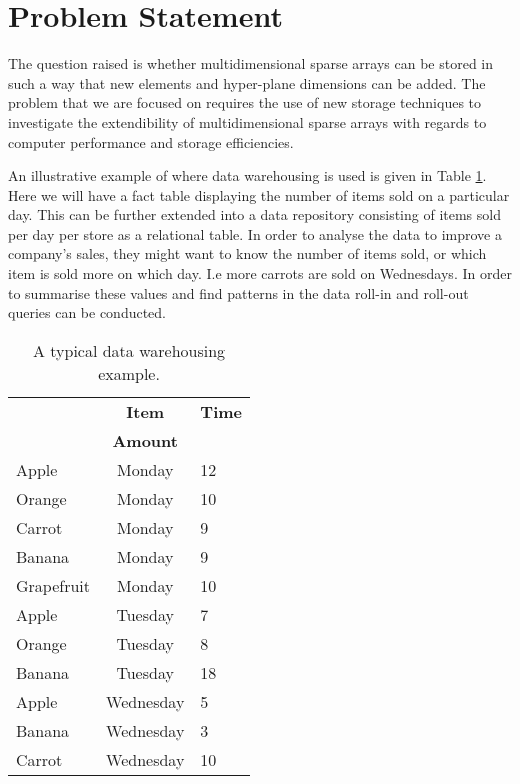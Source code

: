\section{Problem Statement}
The question raised is whether multidimensional sparse arrays can be stored in such a way that new elements and hyper-plane dimensions can be added. The problem that we are focused on requires the use of new storage techniques to investigate the extendibility of multidimensional sparse arrays with regards to computer performance and storage efficiencies.

An illustrative example of where data warehousing is used is given in Table \ref{tab:example}. Here we will have a fact table displaying the number of items sold on a particular day. This can be further extended into a data repository consisting of items sold per day per store as a relational table. In order to analyse the data to improve a company's sales, they might want to know the number of items sold, or which item is sold more on which day. I.e more carrots are sold on Wednesdays. In order to summarise these values and find patterns in the data roll-in and roll-out queries can be conducted. %

\begin{table}[htb]
	\caption{A typical data warehousing example.\label{tab:example}}
	\begin{center}
		\begin{tabular}{p{26mm}cp{35mm}}
			\hline
			&   {\textbf{Item}} & {\textbf{Time}} \\
			&   {\textbf{ Amount}} & \\
			\hline
			Apple   & Monday & 12 \\
			Orange  & Monday & 10\\
			Carrot  & Monday & 9\\
			Banana  & Monday & 9\\
			Grapefruit & Monday & 10\\
			Apple   & Tuesday & 7 \\
			Orange  & Tuesday & 8 \\
			Banana	& Tuesday & 18 \\
			Apple   & Wednesday & 5 \\
			Banana  & Wednesday & 3\\
			Carrot  & Wednesday & 10\\
			\hline
		\end{tabular}
	\end{center}
\end{table}

